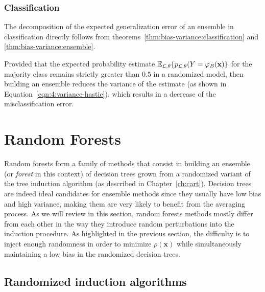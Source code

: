 \subsubsection{Classification}

The decomposition of the expected generalization error of an ensemble in
classification directly follows from theorems~\ref{thm:bias-variance:classification} and
\ref{thm:bias-variance:ensemble}.

Provided that the expected probability estimate $\mathbb{E}_{{\cal L},\theta}\{
p_{{\cal L},\theta}(Y=\varphi_B(\mathbf{x}) \}$ for the majority class remains
strictly greater than $0.5$ in a randomized model, then building an ensemble
reduces the variance of the estimate (as shown in Equation~\ref{eqn:4:variance-hastie}),
which results in a decrease of the misclassification error.


\section{Random Forests}
\label{sec:4:random-forests}

Random forests form a family of methods that consist in building an ensemble
(or \textit{forest} in this context) of decision trees grown from a randomized
variant of the tree induction algorithm (as described in
Chapter~\ref{ch:cart}). Decision trees are indeed ideal candidates for ensemble
methods since they usually have low bias and high variance, making them are
very likely to benefit from the averaging process. As we will review in this
section, random forests methods mostly differ from each other in the way they
introduce random perturbations into the induction procedure. As highlighted in
the previous section, the difficulty is to inject enough randomness in order to
minimize $\rho(\mathbf{x})$ while simultaneously maintaining a low bias in the
randomized decision trees.

\subsection{Randomized induction algorithms}

